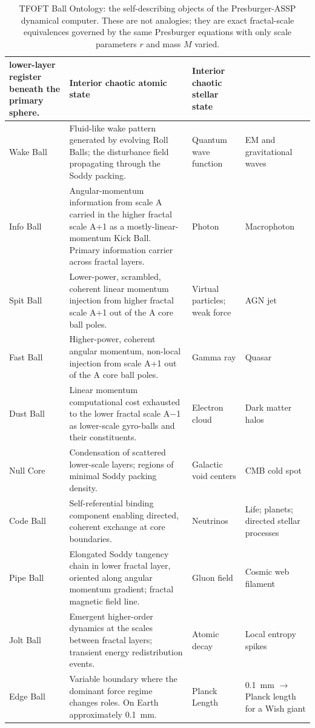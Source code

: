\documentclass[11pt,a4paper]{article}
\begin{document}
\begin{table}[h]
\begin{tabular}{|l|p{4.5cm}|p{2cm}|p{2.5cm}|}
             lower-layer register beneath the primary sphere.
           & Interior chaotic atomic state & Interior chaotic stellar state \\
\hline
Wake Ball  & Fluid-like wake pattern generated by evolving Roll Balls; the
             disturbance field propagating through the Soddy packing.
           & Quantum wave function & EM and gravitational waves \\
\hline
Info Ball  & Angular-momentum information from scale A carried in the higher
             fractal scale A+1 as a mostly-linear-momentum Kick Ball. Primary
             information carrier across fractal layers.
           & Photon & Macrophoton \\
\hline
Spit Ball  & Lower-power, scrambled, coherent linear momentum injection from
             higher fractal scale A+1 out of the A core ball poles.
           & Virtual particles; weak force & AGN jet \\
\hline
Fast Ball  & Higher-power, coherent angular momentum, non-local injection from
             scale A+1 out of the A core ball poles.
           & Gamma ray & Quasar \\
\hline
Dust Ball  & Linear momentum computational cost exhausted to the lower fractal
             scale A$-$1 as lower-scale gyro-balls and their constituents.
           & Electron cloud & Dark matter halos \\
\hline
Null Core  & Condensation of scattered lower-scale layers; regions of minimal
             Soddy packing density.
           & Galactic void centers & CMB cold spot \\
\hline
Code Ball  & Self-referential binding component enabling directed, coherent
             exchange at core boundaries.
           & Neutrinos & Life; planets; directed stellar processes \\
\hline
Pipe Ball  & Elongated Soddy tangency chain in lower fractal layer, oriented
             along angular momentum gradient; fractal magnetic field line.
           & Gluon field & Cosmic web filament \\
\hline
Jolt Ball  & Emergent higher-order dynamics at the scales between fractal layers;
             transient energy redistribution events.
           & Atomic decay & Local entropy spikes \\
\hline
Edge Ball  & Variable boundary where the dominant force regime changes roles.
             On Earth approximately 0.1~mm.
           & Planck Length & 0.1~mm $\to$ Planck length for a Wish giant \\
\hline
\end{tabular}
\caption{TFOFT Ball Ontology: the self-describing objects of the Presburger-ASSP
dynamical computer. These are not analogies; they are exact fractal-scale
equivalences governed by the same Presburger equations with only scale parameters
$r$ and mass $M$ varied.}
\end{table}
\end{document}
